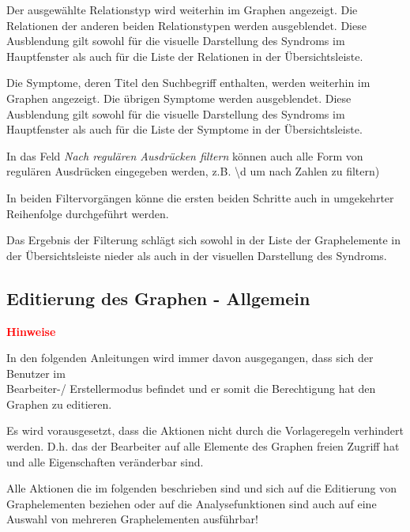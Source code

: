 \documentclass[enabledeprecatedfontcommands,fontsize=11pt,paper=a4,twoside]{scrartcl}
\newcommand*{\red}{\textcolor{red}}
\newcommand*{\bbe}{\textcolor{bbe}}
\newcounter{one}
\newcounter{two}[one]
\let\tempone\itemize
\let\temptwo\enditemize
\renewenvironment{itemize}{\tempone\addtolength{\itemsep}{-10.0pt}}{\temptwo}
\begin{document}
	\begin{itemize}
		\item Der ausgewählte Relationstyp wird weiterhin im Graphen angezeigt. Die Relationen der anderen beiden Relationstypen werden ausgeblendet. Diese Ausblendung gilt sowohl für die visuelle Darstellung des Syndroms im Hauptfenster als auch für die Liste der Relationen in der Übersichtsleiste.
		\item Die Symptome, deren Titel den Suchbegriff enthalten, werden weiterhin im Graphen angezeigt. Die übrigen Symptome werden ausgeblendet. Diese Ausblendung gilt sowohl für die visuelle Darstellung des Syndroms im Hauptfenster als auch für die Liste der Symptome in der Übersichtsleiste.
		\item In das Feld \textit{Nach regulären Ausdrücken filtern} können auch alle Form von regulären Ausdrücken eingegeben werden, z.B. \textbackslash d um nach Zahlen zu filtern)
		\item In beiden Filtervorgängen könne die ersten beiden Schritte auch in umgekehrter Reihenfolge durchgeführt werden.
		\item Das Ergebnis der Filterung schlägt sich sowohl in der Liste der Graphelemente in der Übersichtsleiste nieder als auch in der visuellen Darstellung des Syndroms.\\
	\end{itemize}		
		
	\subsection{Editierung des Graphen - Allgemein}\label{edit}

		\red{\textbf{Hinweise}}
		\begin{itemize}
			\item In den folgenden Anleitungen wird immer davon ausgegangen, dass sich der Benutzer im \\
			Bearbeiter-/ Erstellermodus befindet und er somit die Berechtigung hat den Graphen zu editieren.
			\item Es wird vorausgesetzt, dass die Aktionen nicht durch die Vorlageregeln verhindert werden. D.h. das der Bearbeiter auf alle Elemente des Graphen freien Zugriff hat und alle Eigenschaften veränderbar sind.
			\item \bbe{Alle Aktionen die im folgenden beschrieben sind und sich auf die Editierung von Graphelementen beziehen oder auf die Analysefunktionen sind auch auf eine Auswahl von mehreren Graphelementen ausführbar!}
		\end{itemize}
	
\end{document}
